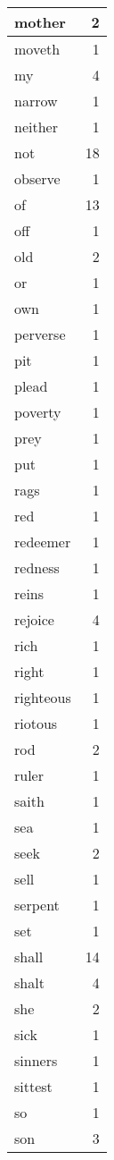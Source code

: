\begin{center}
\begin{longtable}{l|r}
mother & 2\\ \hline 
moveth & 1\\ \hline 
my & 4\\ \hline 
narrow & 1\\ \hline 
neither & 1\\ \hline 
not & 18\\ \hline 
observe & 1\\ \hline 
of & 13\\ \hline 
off & 1\\ \hline 
old & 2\\ \hline 
or & 1\\ \hline 
own & 1\\ \hline 
perverse & 1\\ \hline 
pit & 1\\ \hline 
plead & 1\\ \hline 
poverty & 1\\ \hline 
prey & 1\\ \hline 
put & 1\\ \hline 
rags & 1\\ \hline 
red & 1\\ \hline 
redeemer & 1\\ \hline 
redness & 1\\ \hline 
reins & 1\\ \hline 
rejoice & 4\\ \hline 
rich & 1\\ \hline 
right & 1\\ \hline 
righteous & 1\\ \hline 
riotous & 1\\ \hline 
rod & 2\\ \hline 
ruler & 1\\ \hline 
saith & 1\\ \hline 
sea & 1\\ \hline 
seek & 2\\ \hline 
sell & 1\\ \hline 
serpent & 1\\ \hline 
set & 1\\ \hline 
shall & 14\\ \hline 
shalt & 4\\ \hline 
she & 2\\ \hline 
sick & 1\\ \hline 
sinners & 1\\ \hline 
sittest & 1\\ \hline 
so & 1\\ \hline 
son & 3\\ \hline 

\end{longtable}
\end{center}
